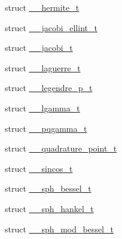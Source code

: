 \begin{DoxyCompactItemize}
\item 
struct \hyperlink{struct____gnu__cxx_1_1____hermite__t}{\+\_\+\+\_\+hermite\+\_\+t}
\item 
struct \hyperlink{struct____gnu__cxx_1_1____jacobi__ellint__t}{\+\_\+\+\_\+jacobi\+\_\+ellint\+\_\+t}
\item 
struct \hyperlink{struct____gnu__cxx_1_1____jacobi__t}{\+\_\+\+\_\+jacobi\+\_\+t}
\item 
struct \hyperlink{struct____gnu__cxx_1_1____laguerre__t}{\+\_\+\+\_\+laguerre\+\_\+t}
\item 
struct \hyperlink{struct____gnu__cxx_1_1____legendre__p__t}{\+\_\+\+\_\+legendre\+\_\+p\+\_\+t}
\item 
struct \hyperlink{struct____gnu__cxx_1_1____lgamma__t}{\+\_\+\+\_\+lgamma\+\_\+t}
\item 
struct \hyperlink{struct____gnu__cxx_1_1____pqgamma__t}{\+\_\+\+\_\+pqgamma\+\_\+t}
\item 
struct \hyperlink{struct____gnu__cxx_1_1____quadrature__point__t}{\+\_\+\+\_\+quadrature\+\_\+point\+\_\+t}
\item 
struct \hyperlink{struct____gnu__cxx_1_1____sincos__t}{\+\_\+\+\_\+sincos\+\_\+t}
\item 
struct \hyperlink{struct____gnu__cxx_1_1____sph__bessel__t}{\+\_\+\+\_\+sph\+\_\+bessel\+\_\+t}
\item 
struct \hyperlink{struct____gnu__cxx_1_1____sph__hankel__t}{\+\_\+\+\_\+sph\+\_\+hankel\+\_\+t}
\item 
struct \hyperlink{struct____gnu__cxx_1_1____sph__mod__bessel__t}{\+\_\+\+\_\+sph\+\_\+mod\+\_\+bessel\+\_\+t}
\end{DoxyCompactItemize}

